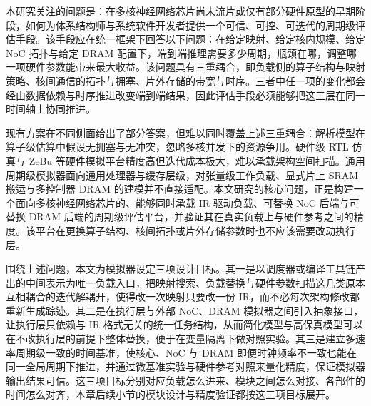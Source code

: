 

\label{sec:c3_problem}

\label{subsec:c3_problem}

本研究关注的问题是：在多核神经网络芯片尚未流片或仅有部分硬件原型的早期阶段，如何为体系结构师与系统软件开发者提供一个可信、可控、可迭代的周期级评估手段。该手段应在统一框架下回答以下问题：在给定映射、给定核内规模、给定 NoC 拓扑与给定 DRAM 配置下，端到端推理需要多少周期，瓶颈在哪，调整哪一项硬件参数能带来最大收益。该问题具有三重耦合，即负载侧的算子结构与映射策略、核间通信的拓扑与拥塞、片外存储的带宽与时序。三者中任一项的变化都会经由数据依赖与时序推进改变端到端结果，因此评估手段必须能够把这三层在同一时间轴上协同推进。

现有方案在不同侧面给出了部分答案，但难以同时覆盖上述三重耦合：解析模型在算子级估算中假设无拥塞与无冲突，忽略多核并发下的资源争用。硬件级 RTL 仿真与 ZeBu 等硬件模拟平台精度高但迭代成本极大，难以承载架构空间扫描。通用周期级模拟器面向通用处理器与缓存层级，对张量级工作负载、显式片上 SRAM 搬运与多控制器 DRAM 的建模并不直接适配。本文研究的核心问题，正是构建一个面向多核神经网络芯片的、能够同时承载 IR 驱动负载、可替换 NoC 后端与可替换 DRAM 后端的周期级评估平台，并验证其在真实负载上与硬件参考之间的精度。该平台在更换算子结构、核间拓扑或片外存储参数时也不应该需要改动执行层。

\label{subsec:c3_goals}

围绕上述问题，本文为模拟器设定三项设计目标。其一是以调度器或编译工具链产出的中间表示为唯一负载入口，把映射搜索、负载替换与硬件参数扫描这几类原本互相耦合的迭代解耦开，使得改一次映射只要改一份 IR，而不必每次架构修改都重新生成踪迹。其二是在执行层与外部 NoC、DRAM 模拟器之间引入抽象接口，让执行层只依赖与 IR 格式无关的统一任务结构，从而简化模型与高保真模型可以在不改执行层的前提下整体替换，便于在变量隔离下做对照实验。其三是建立多速率周期级一致的时间基准，使核心、NoC 与 DRAM 即便时钟频率不一致也能在同一全局周期下推进，并通过微基准实验与硬件参考对照来量化精度，保证模拟器输出结果可信。这三项目标分别对应负载怎么进来、模块之间怎么对接、各部件的时间怎么对齐，本章后续小节的模块设计与精度验证都按这三项目标展开。

\label{sec:c3_arch}


